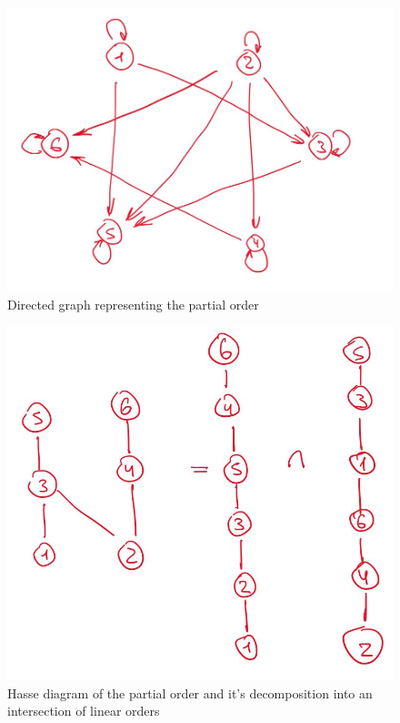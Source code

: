 \documentclass[14pt,a4paper]{extarticle}
\begin{document}
	 \newpage
	 \begin{figure}[h]
	 	\centering
	 	\includegraphics[scale=0.3]{media/graph.jpg}
	 	\caption{Directed graph representing the partial order}
	 	\label{fig:graph}
	 \end{figure}
	 \begin{figure}[h]
	 	\centering
	 	\includegraphics[scale=0.3]{media/hasse.jpg}
	 	\caption{Hasse diagram of the partial order and it's decomposition into an intersection of linear orders}
	 	\label{fig:hasse}
	 \end{figure}
\end{document}
